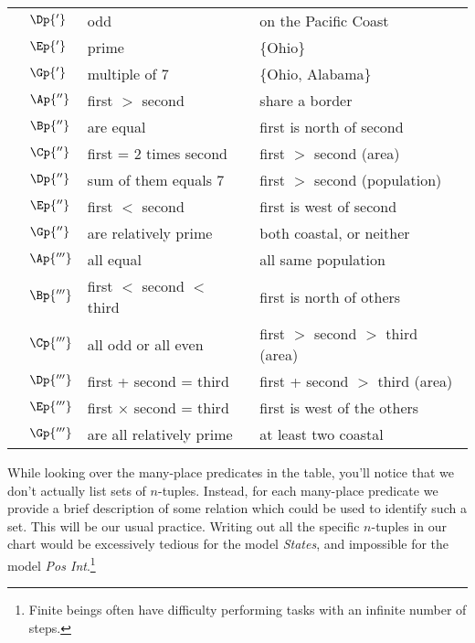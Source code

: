 \begin{longtable}[c]{ l l l l }
	&$\Dp{'}$&odd&on the Pacific Coast\\
	&$\Ep{'}$&prime&\{Ohio\}\\
	&$\Gp{'}$&multiple of 7&\{Ohio, Alabama\}\\ \addlinespace[.25cm]
	{2-place:}&$\Ap{''}$&first $>$ second&share a border\\
	&$\Bp{''}$&are equal&first is north of second\\
	&$\Cp{''}$&first = 2 times second&first $>$ second (area)\\
	&$\Dp{''}$&sum of them equals 7&first $>$ second (population)\\
	&$\Ep{''}$&first $<$ second&first is west of second\\
	&$\Gp{''}$&are relatively prime&both coastal, or neither\\ \addlinespace[.25cm]
	{3-place:}&$\Ap{'''}$&all equal&all same population\\
	&$\Bp{'''}$&first $<$ second $<$ third&first is north of others\\
	&$\Cp{'''}$&all odd or all even&first $>$ second $>$ third (area)\\
	&$\Dp{'''}$&first + second = third&first + second $>$ third (area)\\
	&$\Ep{'''}$&first $\times$ second = third&first is west of the others\\
	&$\Gp{'''}$&are all relatively prime& at least two coastal \\
\end{longtable}

While looking over the many-place predicates in the table, you'll notice that we don't actually list sets of $n$-tuples.  Instead, for each many-place predicate we provide a brief description of some relation which could be used to identify such a set.  This will be our usual practice.  Writing out all the specific $n$-tuples in our chart would be excessively tedious for the model \emph{States}, and impossible for the model \emph{Pos Int}.\footnote{Finite beings often have difficulty performing tasks with an infinite number of steps.}

